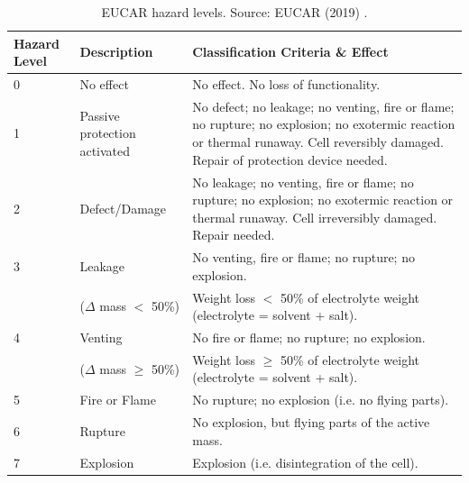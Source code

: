 \begin{table}[H]
    \centering
        \begin{footnotesize}
            \begin{tabular}{|p{13mm} p{28mm} p{102mm}|}
                \hline
                \rowcolor{bluepoli!40}
                \textbf{Hazard Level} & \textbf{Description} & \textbf{Classification Criteria \& Effect}\T\B \\
                \hline \hline
                0 & No effect & No effect. No loss of functionality.\T\B\\
                \hline
                1 & Passive protection activated & No defect; no leakage; no venting, fire or flame; no rupture; no explosion; no exotermic reaction or thermal runaway. Cell reversibly damaged. Repair of protection device needed.\T\B\\
                \hline
                2 & Defect/Damage & No leakage; no venting, fire or flame; no rupture; no explosion; no exotermic reaction or thermal runaway. Cell irreversibly damaged. Repair needed.\T\B\\
                \hline
                3 & Leakage & No venting, fire or flame; no rupture; no explosion.\\
                & ($\Delta$ mass $<$ 50\%) & Weight loss $<$ 50\% of electrolyte weight (electrolyte = solvent + salt).\T\B\\
                \hline
                4 & Venting & No fire or flame; no rupture; no explosion.\\
                & ($\Delta$ mass $\geq$ 50\%) & Weight loss $\geq$ 50\% of electrolyte weight (electrolyte = solvent + salt).\T\B\\
                \hline
                5 & Fire or Flame & No rupture; no explosion (i.e. no flying parts).\T\B\\
                \hline
                6 & Rupture & No explosion, but flying parts of the active mass.\T\B\\
                \hline
                7 & Explosion & Explosion (i.e. disintegration of the cell).\T\B\\
                \hline
                \end{tabular}
                \\[10pt]
                \caption[EUCAR hazard levels]{EUCAR hazard levels. Source: EUCAR (2019) \cite{eucar2019}.}
                \label{table:eucar}
        \end{footnotesize}
\end{table}

